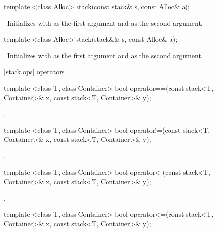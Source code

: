 \begin{itemdecl}
template <class Alloc> stack(const stack& s, const Alloc& a);
\end{itemdecl}

\begin{itemdescr}
\pnum
\effects\ Initializes  with  as the first argument and 
as the second argument.
\end{itemdescr}

\begin{itemdecl}
template <class Alloc> stack(stack&& s, const Alloc& a);
\end{itemdecl}

\begin{itemdescr}
\pnum
\effects\ Initializes  with  as the first argument and 
as the second argument.
\end{itemdescr}

[stack.ops]{ operators}

%
\begin{itemdecl}
template <class T, class Container>
  bool operator==(const stack<T, Container>& x, const stack<T, Container>& y);
\end{itemdecl}

\begin{itemdescr}
\pnum
\returns
{}.
\end{itemdescr}

%
\begin{itemdecl}
template <class T, class Container>
  bool operator!=(const stack<T, Container>& x, const stack<T, Container>& y);
\end{itemdecl}

\begin{itemdescr}
\pnum
\returns
{}.
\end{itemdescr}

%
\begin{itemdecl}
template <class T, class Container>
  bool operator< (const stack<T, Container>& x, const stack<T, Container>& y);
\end{itemdecl}

\begin{itemdescr}
\pnum
\returns
{}.
\end{itemdescr}

%
\begin{itemdecl}
template <class T, class Container>
  bool operator<=(const stack<T, Container>& x, const stack<T, Container>& y);
\end{itemdecl}

